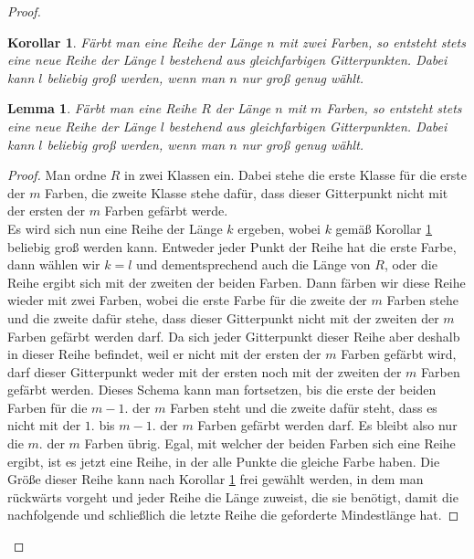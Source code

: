 \documentclass[12pt]{article}
\numberwithin{equation}{subsection}
\newtheorem{lemma}{Lemma}
\newtheorem{korollar}{Korollar}
\begin{document}
\begin{proof}
\begin{korollar}
	Färbt man eine Reihe der Länge $n$ mit zwei Farben, so entsteht stets eine neue Reihe der Länge $l$ bestehend aus gleichfarbigen Gitterpunkten. Dabei kann $l$ beliebig groß werden, wenn man $n$ nur groß genug wählt.
	\label{zweiFarbenlemma}
\end{korollar}

\begin{lemma}
	Färbt man eine Reihe $R$ der Länge $n$ mit $m$ Farben, so entsteht stets eine neue Reihe der Länge $l$ bestehend aus gleichfarbigen Gitterpunkten. Dabei kann $l$ beliebig groß werden, wenn man $n$ nur groß genug wählt.
	\label{xfarbenlemma}
\end{lemma}
\begin{proof}
	Man ordne $R$ in zwei Klassen ein. Dabei stehe die erste Klasse für die erste der $m$ Farben, die zweite Klasse stehe dafür, dass dieser Gitterpunkt nicht mit der ersten der $m$ Farben gefärbt werde.\\
	Es wird sich nun eine Reihe der Länge $k$ ergeben, wobei $k$ gemäß Korollar \ref{zweiFarbenlemma} beliebig groß werden kann. Entweder jeder Punkt der Reihe hat die erste Farbe, dann wählen wir $k=l$ und dementsprechend auch die Länge von $R$, oder die Reihe ergibt sich mit der zweiten der beiden Farben. Dann färben wir diese Reihe wieder mit zwei Farben, wobei die erste Farbe für die zweite der $m$ Farben stehe und die zweite dafür stehe, dass dieser Gitterpunkt nicht mit der zweiten der $m$ Farben gefärbt werden darf. Da sich jeder Gitterpunkt dieser Reihe aber deshalb in dieser Reihe befindet, weil er nicht mit der ersten der $m$ Farben gefärbt wird, darf dieser Gitterpunkt weder mit der ersten noch mit der zweiten der $m$ Farben gefärbt werden. Dieses Schema kann man fortsetzen, bis die erste der beiden Farben für die $m-1.$ der $m$ Farben steht und die zweite dafür steht, dass es nicht mit der $1.$ bis $m-1.$ der $m$ Farben gefärbt werden darf. Es bleibt also nur die $m.$ der $m$ Farben übrig. Egal, mit welcher der beiden Farben sich eine Reihe ergibt, ist es jetzt eine Reihe, in der alle Punkte die gleiche Farbe haben. Die Größe dieser Reihe kann nach Korollar \ref{zweiFarbenlemma} frei gewählt werden, in dem man rückwärts vorgeht und jeder Reihe die Länge zuweist, die sie benötigt, damit die nachfolgende und schließlich die letzte Reihe die geforderte Mindestlänge hat.
\end{proof}


\end{proof}
\end{document}
